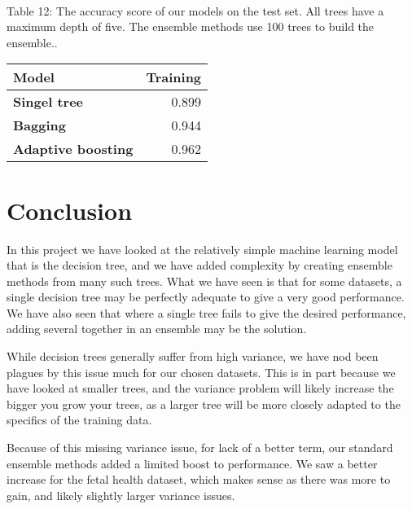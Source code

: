 \documentclass[11pt]{article}
\begin{document}
{ \hspace*{\fill} \\}
Table 12: The accuracy score of our models on the test set. All trees have a maximum depth of five. The ensemble methods use 100 trees to build the ensemble..
\begin{table}[h!]
	\begin{center}
		\label{tab:table1}
		\begin{tabular}{l|r}
			\textbf{Model}                                                 	& \textbf{Training} \\ \hline
			\textbf{Singel tree}                           		             & 0.899            \\ \hline
			\textbf{Bagging}                                    		     & 0.944            \\ \hline
			\textbf{Adaptive boosting}   							    	 & 0.962            \\ \hline
		\end{tabular}
	\end{center}
\end{table}


    \hypertarget{conclusion}{%
\section{Conclusion}\label{conclusion}}

In this project we have looked at the relatively simple machine learning model that is the decision tree, and we have added complexity by creating ensemble methods from many such trees. What we have seen is that for some datasets, a single decision tree may be perfectly adequate to give a very good performance. We have also seen that where a single tree fails to give the desired performance, adding several together in an ensemble may be the solution. 

While decision trees generally suffer from high variance, we have nod been plagues by this issue much for our chosen datasets. This is in part because we have looked at smaller trees, and the variance problem will likely increase the bigger you grow your trees, as a larger tree will be more closely adapted to the specifics of the training data. 

Because of this missing variance issue, for lack of a better term, our standard ensemble methods added a limited boost to performance. We saw a better increase for the fetal health dataset, which makes sense as there was more to gain, and likely slightly larger variance issues. 
\end{document}
